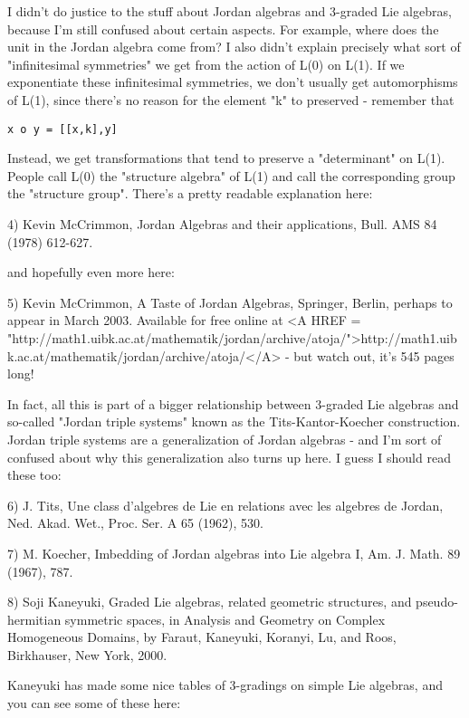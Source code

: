 I didn't do justice to the stuff about Jordan algebras and 3-graded
Lie algebras, because I'm still confused about certain aspects.  For
example, where does the unit in the Jordan algebra come from?  I also
didn't explain precisely what sort of "infinitesimal
symmetries" we get from the action of L(0) on L(1).  If we
exponentiate these infinitesimal symmetries, we don't usually get
automorphisms of L(1), since there's no reason for the element
"k" to preserved - remember that

\begin{verbatim}
x o y = [[x,k],y]
\end{verbatim}
    
Instead, we get transformations that tend to preserve a "determinant"
on L(1).  People call L(0) the "structure algebra" of L(1) and call 
the corresponding group the "structure group".  There's a pretty 
readable explanation here:

4) Kevin McCrimmon, Jordan Algebras and their applications, Bull. 
AMS 84 (1978) 612-627.

and hopefully even more here:

5) Kevin McCrimmon, A Taste of Jordan Algebras, Springer, Berlin,
perhaps to appear in March 2003.  Available for free online at
<A HREF = "http://math1.uibk.ac.at/mathematik/jordan/archive/atoja/">http://math1.uibk.ac.at/mathematik/jordan/archive/atoja/</A> - but watch out,
it's 545 pages long!

In fact, all this is part of a bigger relationship between 3-graded 
Lie algebras and so-called "Jordan triple systems" known as the
Tits-Kantor-Koecher construction.  Jordan triple systems are a
generalization of Jordan algebras - and I'm sort of confused about 
why this generalization also turns up here.  I guess I should read
these too:

6) J. Tits, Une class d'algebres de Lie en relations avec les algebres
de Jordan, Ned. Akad. Wet., Proc. Ser. A 65 (1962), 530.

7) M. Koecher, Imbedding of Jordan algebras into Lie algebra I,
Am. J. Math. 89 (1967), 787. 

8) Soji Kaneyuki, Graded Lie algebras, related geometric structures,
and pseudo-hermitian symmetric spaces, in Analysis and Geometry on 
Complex Homogeneous Domains, by Faraut, Kaneyuki, Koranyi, Lu, and 
Roos, Birkhauser, New York, 2000.

Kaneyuki has made some nice tables of 3-gradings on simple Lie
algebras, and you can see some of these here:

